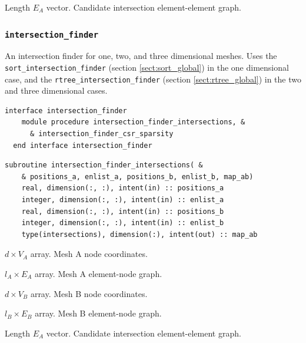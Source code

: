 \documentclass{article}
\begin{document}
\begin{description}[font=\ttfamily\bfseries,leftmargin=2.2\parindent,labelindent=1.7\parindent,noitemsep]
  \item[ints] Length $E_A$ vector. Candidate intersection element-element graph.
\end{description}

\subsubsection{\texttt{intersection\_finder}}

An intersection finder for one, two, and three dimensional meshes. Uses the
\verb+sort_intersection_finder+ (section \ref{sect:sort_global}) in the one
dimensional case, and the \verb+rtree_intersection_finder+ (section
\ref{sect:rtree_global}) in the two and three dimensional cases.

\begin{lstlisting}[language=FORTRAN]
  interface intersection_finder
    module procedure intersection_finder_intersections, &
      & intersection_finder_csr_sparsity
  end interface intersection_finder
\end{lstlisting}

\begin{lstlisting}[language=FORTRAN]
  subroutine intersection_finder_intersections( &
    & positions_a, enlist_a, positions_b, enlist_b, map_ab)
    real, dimension(:, :), intent(in) :: positions_a
    integer, dimension(:, :), intent(in) :: enlist_a
    real, dimension(:, :), intent(in) :: positions_b
    integer, dimension(:, :), intent(in) :: enlist_b
    type(intersections), dimension(:), intent(out) :: map_ab
\end{lstlisting}

\begin{description}[font=\ttfamily\bfseries,leftmargin=2.2\parindent,labelindent=1.7\parindent,noitemsep]
  \item[positions\_a] $d \times V_A$ array. Mesh A node coordinates.
  \item[enlist\_a] $l_A \times E_A$ array. Mesh A element-node graph.
  \item[positions\_b] $d \times V_B$ array. Mesh B node coordinates.
  \item[enlist\_b] $l_B \times E_B$ array. Mesh B element-node graph.
  \item[map\_ab] Length $E_A$ vector. Candidate intersection element-element
    graph.
\end{description}
\end{document}
